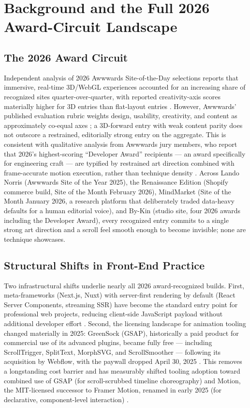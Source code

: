 \documentclass[conference]{IEEEtran}
\begin{document}
\section{Background and the Full 2026 Award-Circuit Landscape}

\subsection{The 2026 Award Circuit}
Independent analysis of 2026 Awwwards Site-of-the-Day selections reports that immersive, real-time 3D/WebGL experiences accounted for an increasing share of recognized sites quarter-over-quarter, with reported creativity-axis scores materially higher for 3D entries than flat-layout entries \cite{dsf_2026}. However, Awwwards' published evaluation rubric weights design, usability, creativity, and content as approximately co-equal axes \cite{awwwards_sotm}; a 3D-forward entry with weak content parity does not outscore a restrained, editorially strong entry on the aggregate. This is consistent with qualitative analysis from Awwwards jury members, who report that 2026's highest-scoring ``Developer Award'' recipients --- an award specifically for engineering craft --- are typified by restrained art direction combined with frame-accurate motion execution, rather than technique density \cite{hontran_2026}. Across Lando Norris (Awwwards Site of the Year 2025), the Renaissance Edition (Shopify commerce build, Site of the Month February 2026), MindMarket (Site of the Month January 2026, a research platform that deliberately traded data-heavy defaults for a human editorial voice), and By-Kin (studio site, four 2026 awards including the Developer Award), every recognized entry commits to a single strong art direction and a scroll feel smooth enough to become invisible; none are technique showcases.

\subsection{Structural Shifts in Front-End Practice}
Two infrastructural shifts underlie nearly all 2026 award-recognized builds. First, meta-frameworks (Next.js, Nuxt) with server-first rendering by default (React Server Components, streaming SSR) have become the standard entry point for professional web projects, reducing client-side JavaScript payload without additional developer effort \cite{figma_2026, logrocket_trends2026}. Second, the licensing landscape for animation tooling changed materially in 2025: GreenSock (GSAP), historically a paid product for commercial use of its advanced plugins, became fully free --- including ScrollTrigger, SplitText, MorphSVG, and ScrollSmoother --- following its acquisition by Webflow, with the paywall dropped April 30, 2025 \cite{openreplay_2026, smashingapps_2026}. This removes a longstanding cost barrier and has measurably shifted tooling adoption toward combined use of GSAP (for scroll-scrubbed timeline choreography) and Motion, the MIT-licensed successor to Framer Motion, renamed in early 2025 (for declarative, component-level interaction) \cite{hontran_gsap2026, motion_docs}.
\end{document}
